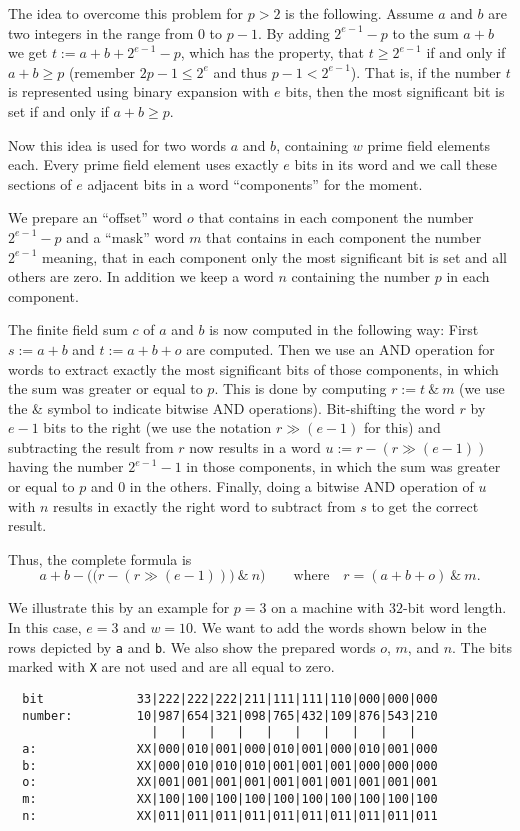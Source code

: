The idea to overcome this problem for $p > 2$ is the following. 
Assume $a$ and $b$
are two integers in the range from $0$ to $p-1$. By adding
$2^{e-1}-p$ to the sum $a+b$ we get $t := a+b+2^{e-1}-p$, which
has the property, that $t \ge 2^{e-1}$ if and only if $a+b \ge p$
(remember $2p-1 \le 2^e$ and thus $p-1 < 2^{e-1}$). That is, if
the number $t$ is represented using binary expansion with $e$ bits,
then the most significant bit is set if and only if $a+b \ge p$.

Now this idea is used for two words $a$ and $b$, containing $w$
prime field elements each. Every prime field element uses exactly $e$ bits
in its word and we call these sections of $e$ adjacent bits in a word 
``components'' for the moment. 

We prepare an ``offset'' word $o$ that contains in each component the
number $2^{e-1}-p$ and a ``mask'' word $m$ that contains in each component
the number $2^{e-1}$ meaning, that in each component only the most significant
bit is set and all others are zero. In addition we keep a word $n$
containing the number $p$ in each component.

The finite field sum $c$ of $a$ and $b$ is now computed in the following way:
First $s := a+b$ and $t := a+b+o$ are computed. Then we use an AND 
operation for words to extract exactly the most significant bits of
those components, in which the sum was greater or equal to $p$.
This is done by computing $r := t \ \&\  m$ (we use the \& symbol to
indicate bitwise AND operations). Bit-shifting
the word $r$ by $e-1$ bits to the right (we use the notation
$r \gg (e-1)$ for this) and subtracting the
result from $r$ now results in a word $u := r - (r \gg (e-1))$
having the number $2^{e-1}-1$
in those components, in which the sum was greater or equal to $p$ and
$0$ in the others. Finally, doing a bitwise AND operation of $u$ with
$n$ results in exactly the right word to subtract from $s$ to get
the correct result.

Thus, the complete formula is
\[ a+b - \Big(\big(r - (r \gg (e-1))\big) \ \&\ n \Big)
   \qquad \mbox{where}\quad r = (a+b+o) \ \&\  m . \]

We illustrate this by an example for $p=3$ on a machine with
$32$-bit word length. In this case, $e = 3$ and $w = 10$. We want to
add the words shown below in the rows depicted by \texttt{a} and \texttt{b}.
We also show the prepared words $o$, $m$, and $n$. The bits marked
with \texttt{X} are not used and are all equal to zero.

\begin{verbatim}
  bit             33|222|222|222|211|111|111|110|000|000|000
  number:         10|987|654|321|098|765|432|109|876|543|210
                    |   |   |   |   |   |   |   |   |   |
  a:              XX|000|010|001|000|010|001|000|010|001|000
  b:              XX|000|010|010|010|001|001|001|000|000|000
  o:              XX|001|001|001|001|001|001|001|001|001|001
  m:              XX|100|100|100|100|100|100|100|100|100|100
  n:              XX|011|011|011|011|011|011|011|011|011|011
\end{verbatim}

